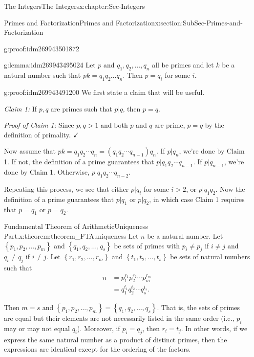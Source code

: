 \documentclass[oneside,10pt,]{book}
\numberwithin{equation}{section}
\newcommand{\set}[1]{\left\{ {#1} \right\}}
\newcommand{\amp}{&}
\begin{document}
\begin{chapterptx}{The Integers}{}{The Integers}{}{}{x:chapter:Sec-Integers}
\begin{sectionptx}{Primes and Factorization}{}{Primes and Factorization}{}{}{x:section:SubSec-Primes-and-Factorization}
\begin{proofptx}{}{g:proof:idm269943501872}
\end{proofptx}
\begin{lemma}{}{}{g:lemma:idm269943495024}%
Let \(p\) and \(q_1, q_2,\ldots,
q_n\) all be primes and let \(k\) be a natural number such that \(pk = q_1 q_2 \ldots q_n\). Then \(p = q_i\) for some \(i\).%
\end{lemma}
\begin{proofptx}{}{g:proof:idm269943491200}
We first state a claim that will be useful.%
\par
\emph{Claim 1:} If \(p,q\) are primes such that \(p|q\), then \(p = q\).%
\par
\emph{Proof of Claim 1:} Since \(p,
q > 1\) and both \(p\) and \(q\) are prime, \(p = q\) by the definition of primality. \(\checkmark\)%
\par
Now assume that \(pk = q_1 q_2 \cdots q_n = (q_1 q_2 \cdots q_{n-1}) q_n\). If \(p|q_n\), we're done by Claim 1. If not, the definition of a prime guarantees that \(p| q_1 q_2 \cdots q_{n-1}\). If \(p|q_{n-1}\), we're done by Claim 1. Otherwise, \(p|q_1 q_2 \cdots q_{n-2}\).%
\par
Repeating this process, we see that either \(p|q_i\) for some \(i > 2\), or \(p|q_1 q_2\). Now the definition of a prime guarantees that \(p|q_1\) or \(p|q_2\), in which case Claim 1 requires that \(p = q_1\) or \(p = q_2\).%
\end{proofptx}
\begin{theorem}{Fundamental Theorem of Arithmetic\textendash{}Uniqueness Part.}{}{x:theorem:theorem_FTAuniqueness}%
Let \(n\) be a natural number. Let \(\set{p_1,p_2,\ldots,p_m}\) and \(\set{q_1,q_2,\ldots,q_s}\) be sets of primes with \(p_i\ne p_j\) if \(i\ne j\) and \(q_i\ne q_j\) if \(i\ne j\). Let \(\set{r_1,r_2,\ldots,r_m}\) and \(\set{t_1,t_2,\ldots,t_s}\) be sets of natural numbers such that%
\begin{align*}
n \amp = p_1^{r_1} p_2^{r_2} \cdots p_m^{r_m}\\
\amp = q_1^{t_1} q_2^{t_2} \cdots q_s^{t_s}\text{.}
\end{align*}
%
\par
Then \(m = s\) and \(\set{p_1,p_2,\ldots,p_m} = \set{q_1,q_2,\ldots,q_s}\). That is, the sets of primes are equal but their elements are not necessarily listed in the same order (i.e., \(p_i\) may or may not equal \(q_i\)). Moreover, if \(p_i = q_j\), then \(r_i = t_j\). In other words, if we express the same natural number as a product of distinct primes, then the expressions are identical except for the ordering of the factors.%

\end{theorem}
\end{sectionptx}
\end{chapterptx}
\end{document}
